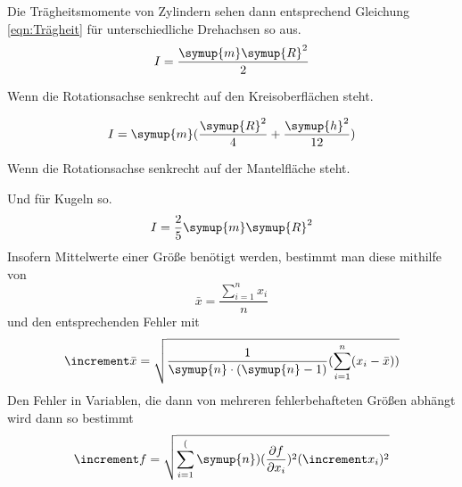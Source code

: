 Die Trägheitsmomente von Zylindern sehen dann entsprechend Gleichung \ref{eqn:Trägheit} für unterschiedliche
Drehachsen so aus.
\begin{equation}
    I=\frac{\symup{m}\symup{R}^2}{2} 
    \label{eqn:Trägheit_Zyl_1} 
\end{equation}
    \begin{center} 
    Wenn die Rotationsachse senkrecht auf den Kreisoberflächen steht.
    \end{center}
\begin{equation}
    I=\symup{m} (\frac{\symup{R}^2}{4}+\frac{\symup{h}^2}{12}) 
    \label{eqn:Trägheit_Zyl_2}  
\end{equation}
\begin{center}   
    Wenn die Rotationsachse senkrecht auf der Mantelfläche steht.
\end{center}

Und für Kugeln so.
\begin{equation}
    I=\frac{2}{5}\symup{m}\symup{R}^2
    \label{eqn:Trägheit_Kugel}
\end{equation}
Insofern Mittelwerte einer Größe benötigt werden, bestimmt man diese mithilfe von
\begin{equation}
    \bar{x}=\frac{\sum_{i=1}^n x_i}{n}
    \label{eqn:MW}
\end{equation}
und den entsprechenden Fehler mit
\begin{equation}
    \increment\bar{x}=\sqrt{\frac{1}{\symup{n}\cdot(\symup{n}-1)}(\sum_{i=1}^n (x_i - \bar{x}))}
\end{equation}
Den Fehler in Variablen, die dann von mehreren fehlerbehafteten Größen abhängt wird dann so bestimmt
\begin{equation}
    \increment f=\sqrt{\sum_{i=1}^(\symup{n}) (\frac{\partial f}{\partial x_i})^2 (\increment x_i)^2}
\end{equation}
\cite{sample}
